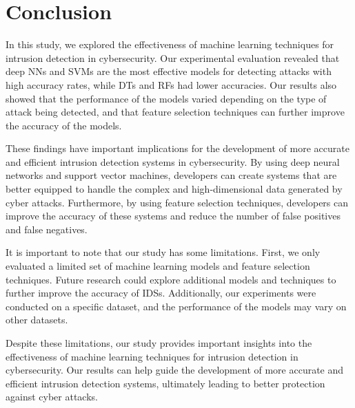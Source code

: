 \chapter{Conclusion}

In this study, we explored the effectiveness of machine learning techniques for intrusion detection in cybersecurity. Our experimental evaluation revealed that deep \acp{NN} and \acp{SVM} are the most effective models for detecting attacks with high accuracy rates, while \acp{DT} and \acp{RF} had lower accuracies. Our results also showed that the performance of the models varied depending on the type of attack being detected, and that feature selection techniques can further improve the accuracy of the models.

These findings have important implications for the development of more accurate and efficient intrusion detection systems in cybersecurity. By using deep neural networks and support vector machines, developers can create systems that are better equipped to handle the complex and high-dimensional data generated by cyber attacks. Furthermore, by using feature selection techniques, developers can improve the accuracy of these systems and reduce the number of false positives and false negatives.

It is important to note that our study has some limitations. First, we only evaluated a limited set of machine learning models and feature selection techniques. Future research could explore additional models and techniques to further improve the accuracy of \acp{IDS}. Additionally, our experiments were conducted on a specific dataset, and the performance of the models may vary on other datasets.

Despite these limitations, our study provides important insights into the effectiveness of machine learning techniques for intrusion detection in cybersecurity. Our results can help guide the development of more accurate and efficient intrusion detection systems, ultimately leading to better protection against cyber attacks.
